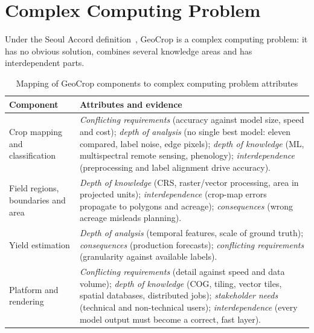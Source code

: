 \section{Complex Computing Problem}
Under the Seoul Accord definition~\cite{seoulaccord2026}, GeoCrop is a complex computing problem: it
has no obvious solution, combines several knowledge areas and has interdependent parts.
\begin{table}[htbp]
\centering\small
\caption{Mapping of GeoCrop components to complex computing problem attributes}
\label{tab:ccp}
\begin{tabularx}{\textwidth}{L{3.8cm} Y}
\toprule
\textbf{Component} & \textbf{Attributes and evidence}\\
\midrule
Crop mapping and classification & \textit{Conflicting requirements} (accuracy against model size, speed and cost); \textit{depth of analysis} (no single best model: eleven compared, label noise, edge pixels); \textit{depth of knowledge} (ML, multispectral remote sensing, phenology); \textit{interdependence} (preprocessing and label alignment drive accuracy).\\
\addlinespace
Field regions, boundaries and area & \textit{Depth of knowledge} (CRS, raster/vector processing, area in projected units); \textit{interdependence} (crop-map errors propagate to polygons and acreage); \textit{consequences} (wrong acreage misleads planning).\\
\addlinespace
Yield estimation & \textit{Depth of analysis} (temporal features, scale of ground truth); \textit{consequences} (production forecasts); \textit{conflicting requirements} (granularity against available labels).\\
\addlinespace
Platform and rendering & \textit{Conflicting requirements} (detail against speed and data volume); \textit{depth of knowledge} (COG, tiling, vector tiles, spatial databases, distributed jobs); \textit{stakeholder needs} (technical and non-technical users); \textit{interdependence} (every model output must become a correct, fast layer).\\
\bottomrule
\end{tabularx}
\end{table}

